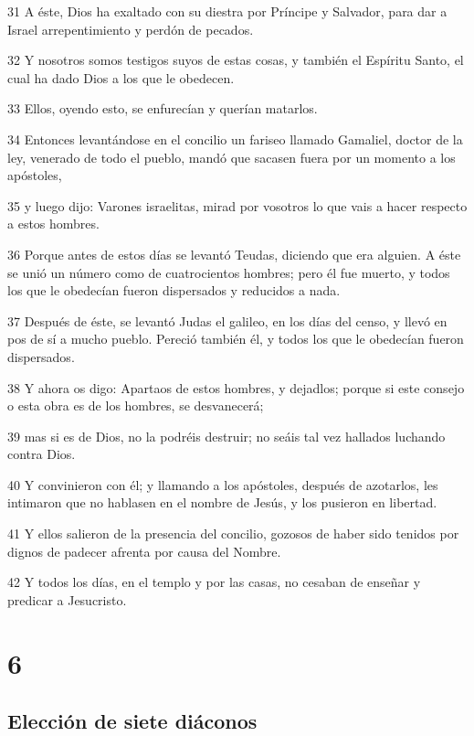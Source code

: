 \par 31 A éste, Dios ha exaltado con su diestra por Príncipe y Salvador, para dar a Israel arrepentimiento y perdón de pecados.
\par 32 Y nosotros somos testigos suyos de estas cosas, y también el Espíritu Santo, el cual ha dado Dios a los que le obedecen.
\par 33 Ellos, oyendo esto, se enfurecían y querían matarlos.
\par 34 Entonces levantándose en el concilio un fariseo llamado Gamaliel, doctor de la ley, venerado de todo el pueblo, mandó que sacasen fuera por un momento a los apóstoles,
\par 35 y luego dijo: Varones israelitas, mirad por vosotros lo que vais a hacer respecto a estos hombres.
\par 36 Porque antes de estos días se levantó Teudas, diciendo que era alguien. A éste se unió un número como de cuatrocientos hombres; pero él fue muerto, y todos los que le obedecían fueron dispersados y reducidos a nada.
\par 37 Después de éste, se levantó Judas el galileo, en los días del censo, y llevó en pos de sí a mucho pueblo. Pereció también él, y todos los que le obedecían fueron dispersados.
\par 38 Y ahora os digo: Apartaos de estos hombres, y dejadlos; porque si este consejo o esta obra es de los hombres, se desvanecerá;
\par 39 mas si es de Dios, no la podréis destruir; no seáis tal vez hallados luchando contra Dios.
\par 40 Y convinieron con él; y llamando a los apóstoles, después de azotarlos, les intimaron que no hablasen en el nombre de Jesús, y los pusieron en libertad.
\par 41 Y ellos salieron de la presencia del concilio, gozosos de haber sido tenidos por dignos de padecer afrenta por causa del Nombre.
\par 42 Y todos los días, en el templo y por las casas, no cesaban de enseñar y predicar a Jesucristo.

\chapter{6}

\section*{Elección de siete diáconos}

